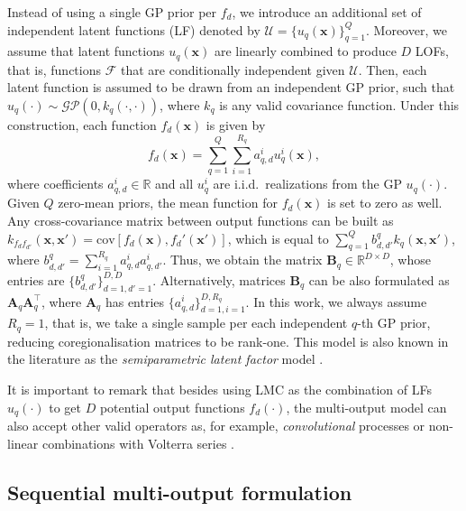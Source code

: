 \documentclass[]{article}
\def\A{{\mathbf A}}
\def\B{{\mathbf B}}
\newcommand{\Rbb}{\mathbb{R}}
\newcommand{\Fcal}{\mathcal{F}}
\newcommand{\Ucal}{\mathcal{U}}
\newcommand{\xc}{\bm{x}}
\begin{document}
Instead of using a single GP prior per $f_d$, we introduce an additional set of independent latent functions (LF) denoted by $\Ucal = \{u_q(\xc)\}^Q_{q=1}$. Moreover, we assume that latent functions $u_q(\xc)$ are linearly combined to produce $D$ LOFs, that is, functions $\Fcal$ that are conditionally independent given $\Ucal$. Then, each latent function is assumed to be drawn from an independent GP prior, such that $u_q(\cdot) \sim \mathcal{GP}(0,k_q(\cdot,\cdot))$, where $k_q$ is any valid covariance function. Under this construction, each function $f_d(\xc)$ is given by
\begin{equation}
	\label{eq:lmc_function}
		f_d(\xc) = \sum_{q=1}^{Q}\sum_{i=1}^{R_q}a^i_{q,d} u^i_q(\xc),
\end{equation}
where coefficients $a^i_{q,d} \in \Rbb$ and all $u^i_q$ are i.i.d.\ realizations from the GP $u_q(\cdot)$. Given $Q$ zero-mean priors, the mean function for $f_d(\xc)$ is set to zero as well. Any cross-covariance matrix between output functions can be built as $k_{f_df_{d'}}(\xc,\xc') = \text{cov}[f_d(\xc), f_d'(\xc')]$, which is equal to $\sum_{q=1}^{Q}b^q_{d,d'}k_q(\xc,\xc')$, where $b^q_{d,d'} = \sum^{R_q}_{i=1}a^i_{q,d} a^i_{q,d'}$. Thus, we obtain the matrix $\B_q\in \mathbb{R}^{D\times D}$, whose entries are $\{b^q_{d,d'}\}^{D,D}_{d=1, d'=1}$. Alternatively, matrices $\B_q$ can be also formulated as $\A_q\A_q^\top$, where $\A_q$ has entries $\{a^i_{q,d}\}^{D,R_q}_{d=1, i=1}$. In this work, we always assume $R_q = 1$, that is, we take a single sample per each independent $q$-th GP prior, reducing coregionalisation matrices to be rank-one. This model is also known in the literature as the \textit{semiparametric latent factor} model \citep{teh2005semiparametric}.  

It is important to remark that besides using LMC as the combination of LFs $u_q(\cdot)$ to get $D$ potential output functions $f_d(\cdot)$, the multi-output model can also accept other valid operators as, for example, \textit{convolutional} processes \citep{alvarez2009sparse} or non-linear combinations with Volterra series \citep{alvarez2019non}. 

\subsection{Sequential multi-output formulation}
\end{document}
